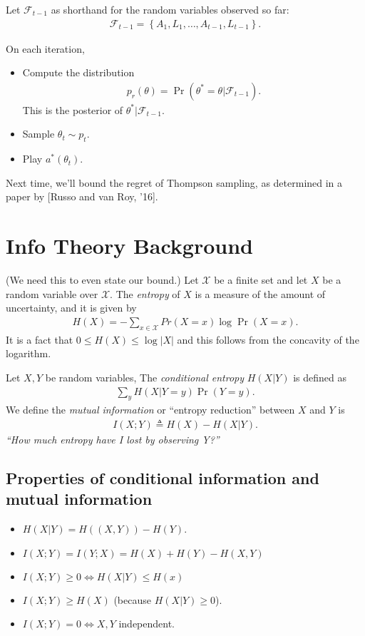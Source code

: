 \documentclass[11pt]{article}
\newcommand{\te}{\triangleq}
\begin{document}
Let $\mathcal{F}_{t - 1}$ as shorthand for the random variables observed so far:
\begin{align*}
  \mathcal{F}_{t - 1} = \left\{ A_1, L_1, \dots, A_{t - 1}, L_{t - 1} \right\}.
\end{align*}

On each iteration,
\begin{itemize}
  \item Compute the distribution
    \begin{align*}
      p_r(\theta) = \Pr(\theta^* = \theta | \mathcal{F}_{t - 1}).
    \end{align*}
    This is the posterior of $\theta^* | \mathcal{F}_{t - 1}$.
  \item Sample $\theta_t \sim p_t$.
  \item Play $a^*(\theta_t)$.
\end{itemize}
Next time, we'll bound the regret of Thompson sampling,
as determined in a paper by [Russo and van Roy, '16].

\section{Info Theory Background}
(We need this to even state our bound.)
Let $\mathcal{X}$ be a finite set
and let $X$ be a random variable over $\mathcal{X}$. 
The \textit{entropy} of $X$ is a measure of the amount of uncertainty,
and it is given by
\begin{align*}
  H(X) = -\sum_{x \in \mathcal{X}} Pr(X = x) \log \Pr(X = x).
\end{align*}
It is a fact that $0 \leq H(X) \leq \log |X|$ and this follows from the concavity of the logarithm.

Let $X, Y$ be random variables,
The \textit{conditional entropy}  $H(X | Y)$ is defined as
\begin{align*}
  \sum_y H(X | Y = y) \Pr(Y = y).
\end{align*}
We define the \textit{mutual information} or ``entropy reduction'' between $X$ and $Y$ is
\begin{align*}
  I(X; Y) \te H(X) - H(X|Y).
\end{align*}
\textit{``How much entropy have I lost by observing Y?''}

\subsection{Properties of conditional information and mutual information}
\begin{itemize}
  \item $H(X|Y) = H((X, Y)) - H(Y)$.
  \item $I(X; Y) = I(Y; X) = H(X) + H(Y) - H(X, Y)$
  \item $I(X; Y) \geq 0 \Leftrightarrow H(X | Y) \leq H(x)$
  \item $I(X; Y) \geq H(X)$ (because $H(X|Y) \geq 0$).
  \item $I(X; Y) = 0 \Leftrightarrow X, Y$ independent.
\end{itemize}

\end{document}
